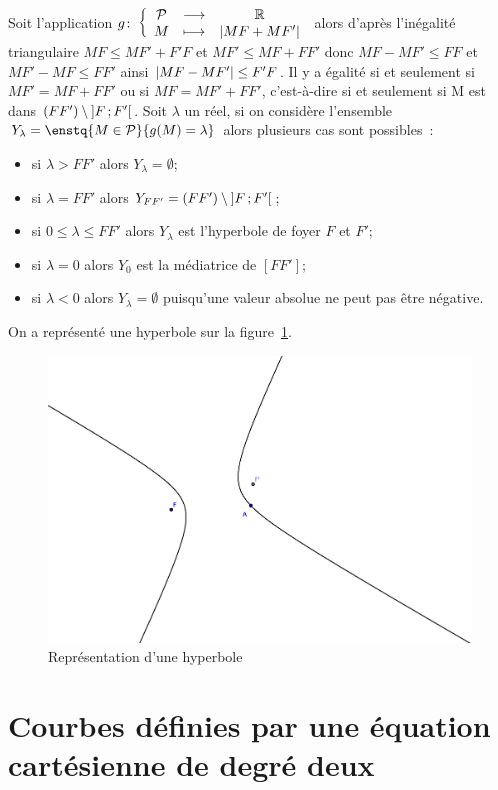 Soit l'application $g\colon \left\{\begin{array}{ccc} \mathcal{P} & \longrightarrow &\mathbb{R}\\ M & \longmapsto & \left\lvert MF+MF'\right\rvert \end{array} \right.$ alors d'après l'inégalité triangulaire $MF \leq MF'+F'F$ et $MF'\leq MF+FF'$ donc $MF-MF'\leq FF$ et $MF'-MF\leq FF'$ ainsi $\left\lvert MF-MF'\right\rvert\leq F'F$. Il y a égalité si et seulement si $MF'=MF+FF'$ ou si $MF=MF'+FF'$, c'est-à-dire si et seulement si M est dans $(FF') \setminus \left] F \, ;  F' \right[$. Soit $\lambda$ un réel, si on considère l'ensemble $Y_{\lambda}=\enstq{M \in \P}{g(M)=\lambda}$ alors plusieurs cas sont possibles~:
\begin{itemize}
\item si $\lambda>FF'$ alors $Y_{\lambda}=\emptyset$;
\item si $\lambda=FF'$ alors $Y_{FF'}=(FF') \setminus \left] F \, ;  F' \right[$;
\item si $0\leq\lambda\leq FF'$ alors $Y_{\lambda}$ est l'hyperbole de foyer $F$ et $F'$;
\item si $\lambda=0$ alors $Y_{0}$ est la médiatrice de $[FF']$;
\item si $\lambda<0$ alors $Y_{\lambda}=\emptyset$ puisqu'une valeur absolue ne peut pas être négative.
\end{itemize}

On a représenté une hyperbole sur la figure~\ref{fig:hyperbole}.

\begin{figure}[!h]
  \centering
  \includegraphics[width=\textwidth]{./hyperbole.eps}
  \caption{Représentation d'une hyperbole}
  \label{fig:hyperbole}
\end{figure}


\section{Courbes définies par une équation cartésienne de degré deux}
\label{sec:eqcart}
